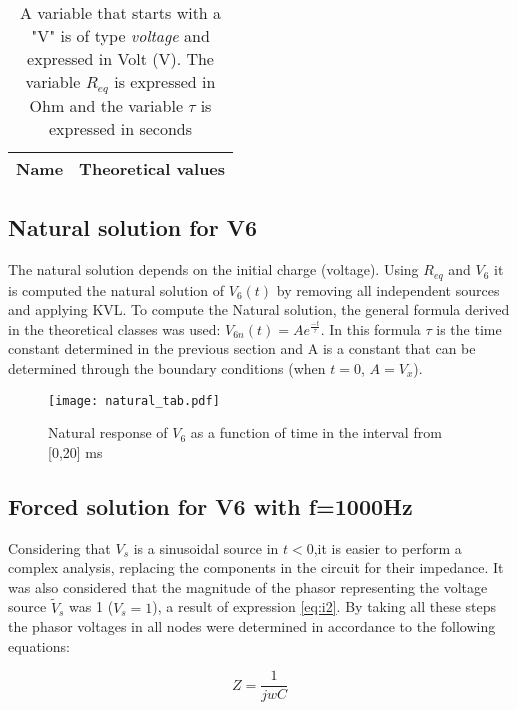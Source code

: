\begin{table}[H]

  \centering
  \begin{tabular}{|l|r|}
    \hline    
    {\bf Name} & {\bf Theoretical values }\\ \hline
    
  \end{tabular}
  \vspace{10px}
  \caption{A variable that starts with a "V" is of type {\it voltage} and expressed in
    Volt (V). The variable $R_{eq}$ is expressed in Ohm and the variable $\tau$ is expressed in seconds }
  \label{tab:equivalent resistor}
\end{table}

\subsection{Natural solution for V6}
The natural solution depends on the initial charge (voltage). Using $R_{eq}$ and $V_6$ it is computed the natural solution of $V_6(t)$ by removing all independent sources and applying KVL. To compute the Natural solution, the general formula derived in the theoretical classes was used: $V_{6n}(t)=Ae^{\frac{-t}{\tau}}$. In this formula $\tau$ is the time constant determined in the previous section and  A is a constant that can be determined through the boundary conditions (when $t=0$, $A=V_x$).


\begin{figure}[H] \centering
\texttt{[image: natural\_tab.pdf]} 
\caption{Natural response of $V_6$ as a function of time in the interval from [0,20] ms}
\label{fig:natural}
\end{figure} 
\pagebreak

\subsection{Forced solution for V6 with f=1000Hz}
Considering that $V_s$ is a sinusoidal source in $t<0$,it is easier to perform a complex analysis, replacing the components in the circuit for their impedance. 
It was also  considered that the magnitude of the phasor representing the voltage source $\tilde{V}_s$ was 1 ($V_s=1$), a result of expression \ref{eq:i2}. By taking all these steps the phasor voltages in all nodes were determined in accordance to the following equations:

\begin {equation}
	Z = \frac{1}{j w C}
	\label{eq:Z}
\end{equation}

